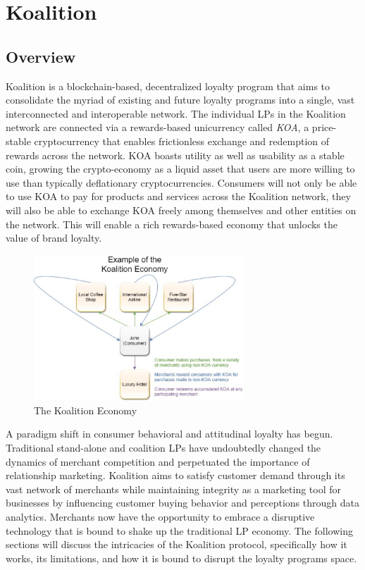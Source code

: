 \section{Koalition}
\subsection{Overview}
Koalition is a blockchain-based, decentralized loyalty program that aims to consolidate the myriad of existing and future loyalty programs into a single, vast interconnected and interoperable network. The individual LPs in the Koalition network are connected via a rewards-based unicurrency called \textit{KOA}, a price-stable cryptocurrency that enables frictionless exchange and redemption of rewards across the network. KOA boasts utility as well as usability as a stable coin, growing the crypto-economy as a liquid asset that users are more willing to use than typically deflationary cryptocurrencies. Consumers will not only be able to use KOA to pay for products and services across the Koalition network, they will also be able to exchange KOA freely among themselves and other entities on the network. This will enable a rich rewards-based economy that unlocks the value of brand loyalty.
%
\begin{figure}[h] %
    \centering
        \includegraphics[keepaspectratio, width=0.7\textwidth]{images/KOAeconomy.png}
    \caption{The Koalition Economy} \label{fig:KOAeconomy}
\end{figure}

A paradigm shift in consumer behavioral and attitudinal loyalty has begun. Traditional stand-alone and coalition LPs have undoubtedly changed the dynamics of merchant competition and perpetuated the importance of relationship marketing. Koalition aims to satisfy customer demand through its vast network of merchants while maintaining integrity as a marketing tool for businesses by influencing customer buying behavior and perceptions through data analytics. Merchants now have the opportunity to embrace a disruptive technology that is bound to shake up the traditional LP economy. The following sections will discuss the intricacies of the Koalition protocol, specifically how it works, its limitations, and how it is bound to disrupt the loyalty programs space.

